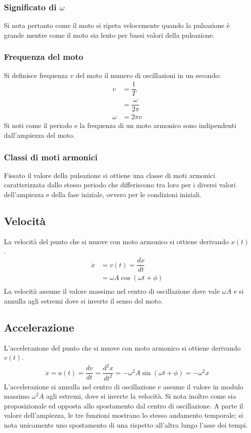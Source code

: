 \documentclass[class=book, crop=false, oneside, 12pt]{standalone}
\begin{document}
		\subsubsection{Significato di $\omega$}
		Si nota pertanto come il moto si ripeta velocemente quando la pulsazione \`e grande mentre come il moto sia lento per bassi valori della pulsazione.
		\subsubsection{Frequenza del moto}
		Si definisce frequenza $v$ del moto il numero di oscillazioni in un secondo:
		\begin{align*}
			v &= \dfrac{1}{T}\\
			  &= \dfrac{\omega}{2\pi}\\
			\omega &= 2\pi v
		\end{align*}
		Si noti come il periodo e la frequenza di un moto armonico sono indipendenti dall'ampiezza del moto.
		\subsubsection{Classi di moti armonici}
		Fissato il valore della pulsazione si ottiene una classe di moti armonici caratterizzata dallo stesso periodo che differiscono tra loro per i diversi valori dell'ampiezza e della fase iniziale, ovvero per le condizioni iniziali.
	\subsection{Velocit\`a}
	La velocit\`a del punto che si muove con moto armonico si ottiene derivando $x(t)$.
	\begin{align*}
		\dot{x} &= v(t) = \dfrac{dx}{dt}\\
		  &=\omega A \cos(\omega t+\phi)\\
	\end{align*}
	La velocit\`a assume il valore massimo nel centro di oscillazione dove vale $\omega A$ e si annulla agli estremi dove si inverte il senso del moto.
	\subsection{Accelerazione}
	L'accelerazione del punto che si muove con moto armonico si ottiene derivando $v(t)$.
	\begin{align*}
		\ddot{x} = a(t) = \dfrac{dv}{dt} = \dfrac{d^2x}{dt^2}= -\omega^2 A \sin(\omega t + \phi)= -\omega^2 x
	\end{align*}
	L'accelerazione si annulla nel centro di oscillazione e assume il valore in modulo massimo $\omega^2 A$ agli estremi, dove si inverte la velocit\`a.
	Si nota inoltre come sia proposizionale ed opposta allo spostamento dal centro di oscillazione.
	A parte il valore dell'ampiezza, le tre funzioni mostrano lo stesso andamento temporale; si nota unicamente uno spostamento di una rispetto all'altra lungo l'asse dei tempi.
	
\end{document}

